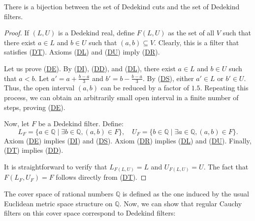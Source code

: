\documentclass[reqno]{amsart}
\newcommand{\axref}[1]{(\hyperref[ax:#1]{#1})}
\theoremstyle{definition}
\theoremstyle{remark}
\numberwithin{figure}{section}
\begin{document}
\begin{prop}
There is a bijection between the set of Dedekind cuts and the set of Dedekind filters.
\end{prop}
\begin{proof}
If $(L,U)$ is a Dedekind real, define $F(L,U)$ as the set of all $V$ such that there exist $a \in L$ and $b \in U$ such that $(a,b) \subseteq V$.
Clearly, this is a filter that satisfies \axref{DT}.  
Axioms \axref{DL} and \axref{DU} imply \axref{DR}.  

Let us prove \axref{DE}.
By \axref{DI}, \axref{DD}, and \axref{DL}, there exist $a \in L$ and $b \in U$ such that $a < b$.
Let $a' = a + \frac{b - a}{3}$ and $b' = b - \frac{b - a}{3}$.
By \axref{DS}, either $a' \in L$ or $b' \in U$.  
Thus, the open interval $(a,b)$ can be reduced by a factor of $1.5$.  
Repeating this process, we can obtain an arbitrarily small open interval in a finite number of steps, proving \axref{DE}.  

Now, let $F$ be a Dedekind filter.
Define:  
\[ L_F = \{ a \in \mathbb{Q} \mid \exists b \in \mathbb{Q}, (a,b) \in F \}, \quad U_F = \{ b \in \mathbb{Q} \mid \exists a \in \mathbb{Q}, (a,b) \in F \}. \]
Axiom \axref{DE} implies \axref{DI} and \axref{DS}.  
Axiom \axref{DR} implies \axref{DL} and \axref{DU}.  
Finally, \axref{DT} implies \axref{DD}.  

It is straightforward to verify that $L_{F(L,U)} = L$ and $U_{F(L,U)} = U$.  
The fact that $F(L_F,U_F) = F$ follows directly from \axref{DT}.  
\end{proof}

The cover space of rational numbers $\mathbb{Q}$ is defined as the one induced by the usual Euclidean metric space structure on $\mathbb{Q}$.
Now, we can show that regular Cauchy filters on this cover space correspond to Dedekind filters:
\end{document}
